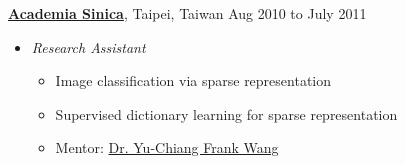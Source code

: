 \documentclass[10pt]{article}
\newenvironment{innerlist}[1][\enskip\textbullet]%
        {\begin{itemize}[#1,leftmargin=*,parsep=0pt,itemsep=0pt,topsep=0pt,partopsep=0pt]}
        {\end{itemize}}
\begin{document}
\vspace{.1in}
\href{http://www.sinica.edu.tw}{\textbf{Academia Sinica}}, Taipei, Taiwan \hfill {Aug 2010 to July 2011} \\
\vspace{-.15in}
\begin{innerlist}
\item[] \emph{Research Assistant} \\
    \vspace{-.15in}
    \begin{innerlist}
    \item Image classification via sparse representation
    \item Supervised dictionary learning for sparse representation
    \item Mentor: \href{http://www.citi.sinica.edu.tw/pages/ycwang/}{Dr. Yu-Chiang Frank Wang}
    \end{innerlist}
\end{innerlist}
\end{document}
